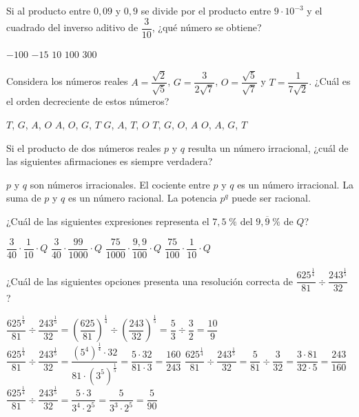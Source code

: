 \documentclass[sin nombre]{srs}
\begin{document}
\separador
\begin{preguntas}[after-item-skip=1cm]

\pregunta Si al producto entre $0,09$ y $0,9$ se divide por el producto entre
$9 \cdot 10^{-3}$ y el cuadrado del inverso aditivo de $\dfrac{3}{10}$,
¿qué número se obtiene?
\begin{vertical}
\alternativa $-100$
\alternativa $-15$
\alternativa $10$
\alternativa $100$
\alternativa $300$
\end{vertical}

\pregunta Considera los números reales $A = \dfrac{\sqrt{2}}{\sqrt{5}}$,
$G = \dfrac{3}{2\sqrt{7}}$, $O = \dfrac{\sqrt{5}}{\sqrt{7}}$ y
$T = \dfrac{1}{7\sqrt{2}}$. ¿Cuál es el orden decreciente de estos números?
\begin{vertical}
\alternativa $T$, $G$, $A$, $O$
\alternativa $A$, $O$, $G$, $T$
\alternativa $G$, $A$, $T$, $O$
\alternativa $T$, $G$, $O$, $A$
\alternativa $O$, $A$, $G$, $T$
\end{vertical}

\pregunta Si el producto de dos números reales $p$ y $q$ resulta un
número irracional, ¿cuál de las siguientes afirmaciones es
siempre verdadera?
\begin{vertical}
\alternativa $p$ y $q$ son números irracionales.
\alternativa El cociente entre $p$ y $q$ es un número irracional.
\alternativa La suma de $p$ y $q$ es un número racional.
\alternativa La potencia $p^q$ puede ser racional.
\end{vertical}

\pregunta ¿Cuál de las siguientes expresiones representa el $7,5\;\%$ del
$9,\overline{9}\;\%$ de $Q$?
\begin{vertical}
\alternativa $\dfrac{3}{40} \cdot \dfrac{1}{10} \cdot Q$
\alternativa $\dfrac{3}{40} \cdot \dfrac{99}{1000} \cdot Q$
\alternativa $\dfrac{75}{1000} \cdot \dfrac{9,9}{100} \cdot Q$
\alternativa $\dfrac{75}{100} \cdot \dfrac{1}{10} \cdot Q$
\end{vertical}

\pregunta ¿Cuál de las siguientes opciones presenta una resolución correcta
de $\dfrac{625^{\frac{1}{4}}}{81} \div \dfrac{243^{\frac{1}{5}}}{32}$ ?
\begin{vertical}
\alternativa $\dfrac{625^{\frac{1}{4}}}{81} \div \dfrac{243^{\frac{1}{5}}}{32} = \left(\dfrac{625}{81}\right)^{\frac{1}{4}} \div \left(\dfrac{243}{32}\right)^{\frac{1}{5}} = \dfrac{5}{3} \div \dfrac{3}{2} = \dfrac{10}{9}$
\alternativa $\dfrac{625^{\frac{1}{4}}}{81} \div \dfrac{243^{\frac{1}{5}}}{32} = \dfrac{\left(5^4\right)^{\frac{1}{4}} \cdot 32}{81 \cdot \left(3^5\right)^{\frac{1}{5}}} = \dfrac{5 \cdot 32}{81 \cdot 3} = \dfrac{160}{243}$
\alternativa $\dfrac{625^{\frac{1}{4}}}{81} \div \dfrac{243^{\frac{1}{5}}}{32} = \dfrac{5}{81} \div \dfrac{3}{32} = \dfrac{3 \cdot 81}{32 \cdot 5} = \dfrac{243}{160}$
\alternativa $\dfrac{625^{\frac{1}{4}}}{81} \div \dfrac{243^{\frac{1}{5}}}{32} = \dfrac{5 \cdot 3}{3^4 \cdot 2^5} = \dfrac{5}{3^3 \cdot 2^5} = \dfrac{5}{90}$
\end{vertical}


\end{preguntas}
\end{document}
